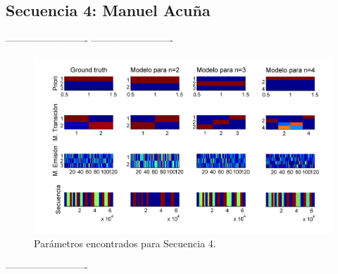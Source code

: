 \newpage
\subsection{Secuencia 4: Manuel Acuña}

-------------------------
-------------------------

\begin{figure}[H]
  \centerline
  {\includegraphics[width=1.3\linewidth]{gfx/chap6/noct1}} \quad
  \caption{Parámetros encontrados para Secuencia 4.}
  \label{fig:prb1_par}
\end{figure}

-------------------------

